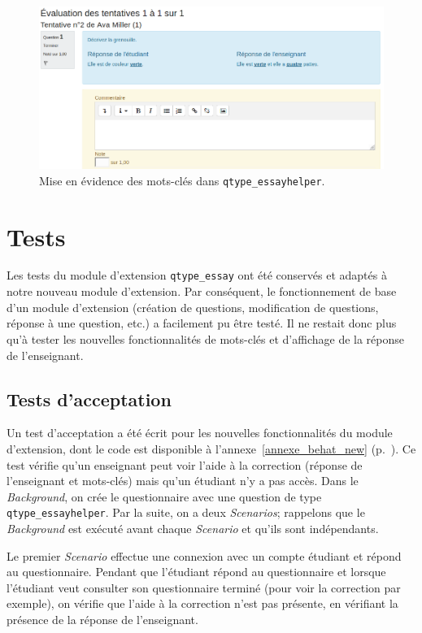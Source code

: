 \begin{figure}[htbp]
  \includegraphics[scale=0.56]{images/correction-essayhelper.png}
  \caption{Mise en \'evidence des mots-cl\'es dans \texttt{qtype\_essayhelper}.}
  \label{dev-correction-screenshot}
\end{figure}

\section{Tests} \label{dev_test}
Les tests du module d'extension \texttt{qtype\_essay} ont \'et\'e conserv\'es et adapt\'es \`a notre nouveau module d'extension.
Par cons\'equent, le fonctionnement de base d'un module d'extension (cr\'eation de questions, modification de questions, r\'eponse \`a une question, etc.) a facilement pu \^etre test\'e.
Il ne restait donc plus qu'\`a tester les nouvelles fonctionnalit\'es de mots-cl\'es et d'affichage de la r\'eponse de l'enseignant.

\subsection{Tests d'acceptation} \label{dev_test_acceptation}
Un test d'acceptation a \'et\'e \'ecrit pour les nouvelles fonctionnalit\'es du module d'extension, dont le code est disponible \`a l'annexe~\ref{annexe_behat_new} (p.~\pageref{annexe_behat_new}).
Ce test v\'erifie qu'un enseignant peut voir l'aide \`a la correction (r\'eponse de l'enseignant et mots-cl\'es) mais qu'un \'etudiant n'y a pas acc\`es.
Dans le \textit{Background}, on crée le questionnaire avec une question de type \texttt{qtype\_essayhelper}.
Par la suite, on a deux \textit{Scenarios}; rappelons que le \textit{Background} est ex\'ecut\'e avant chaque \textit{Scenario} et qu'ils sont ind\'ependants.

Le premier \textit{Scenario} effectue une connexion avec un compte \'etudiant et r\'epond au questionnaire.
Pendant que l'\'etudiant r\'epond au questionnaire et lorsque l'\'etudiant veut consulter son questionnaire termin\'e (pour voir la correction par exemple), on v\'erifie que l'aide \`a la correction n'est pas pr\'esente, en v\'erifiant la pr\'esence de la r\'eponse de l'enseignant.

